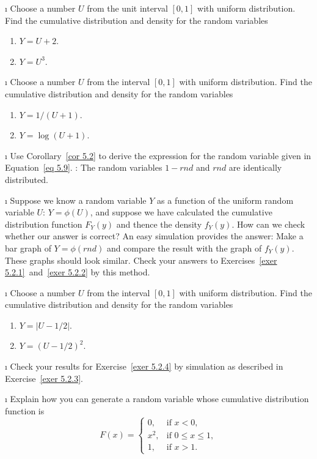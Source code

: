 \exercises
\begin{LJSItem}

\i\label{exer 5.2.1} Choose a number $U$ from the unit interval $[0,1]$ with
uniform distribution.  Find the cumulative distribution and density for the random variables
\begin{enumerate}
\item $Y = U + 2$.

\item $Y = U^3$.
\end{enumerate}

\i\label{exer 5.2.2} Choose a number $U$ from the interval $[0,1]$ with uniform
distribution.  Find the cumulative distribution and density for the random variables
\begin{enumerate}
\item $Y = 1/(U + 1)$.

\item $Y = \log(U + 1)$.
\end{enumerate}

\i\label{exer 5.2.2.5} Use Corollary~\ref{cor 5.2} to derive the expression for the
random  variable given in Equation~\ref{eq 5.9}.   :  The random variables 
$1 - rnd$ and $rnd$ are identically distributed.


\i\label{exer 5.2.3} Suppose we know a random variable $Y$ as a function of the
uniform random variable $U$: $Y = \phi(U)$, and suppose we have calculated the
cumulative distribution function $F_Y(y)$ and thence the density $f_Y(y)$.  How can we check
whether our answer is correct?  An easy simulation provides the answer: Make a bar
graph of $Y = \phi(\mbox{$rnd$})$ and compare the result with the graph of
$f_Y(y)$.  These graphs should look similar.  Check your answers to Exercises~\ref{exer
5.2.1}~and~\ref{exer 5.2.2} by this method.

\i\label{exer 5.2.4} Choose a number $U$ from the interval $[0,1]$ with uniform
distribution.  Find the cumulative distribution and density for the random variables
\begin{enumerate}
\item $Y = |U - 1/2|$.

\item $Y = (U - 1/2)^2$.
\end{enumerate}

\i\label{exer 5.2.5} Check your results for Exercise~\ref{exer 5.2.4} by simulation
as described in Exercise~\ref{exer 5.2.3}.

\i\label{exer 5.2.6} Explain how you can generate a random variable whose
cumulative distribution function is
$$ F(x) =  \left \{ \begin{array}{ll}
              0, & \mbox{if $x < 0$}, \\
            x^2, & \mbox{if $0 \leq x \leq 1$}, \\
              1, & \mbox{if $x > 1.$}
                 \end{array}
        \right.
$$


\end{LJSItem}
